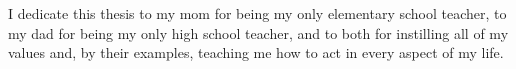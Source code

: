 \leavevmode\vfill
I dedicate this thesis to my mom for being my only elementary school teacher, to my dad for being my only high school teacher, and to both for instilling all of my values and, by their examples, teaching me how to act in every aspect of my life.
\vfill
